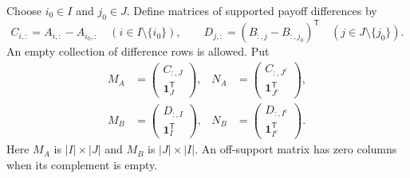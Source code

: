 \documentclass[11pt]{article}
\newcommand{\one}{\mathbf 1}
\theoremstyle{definition}
\theoremstyle{remark}
\begin{document}
Choose $i_0\in I$ and $j_0\in J$. Define matrices of supported payoff
differences by
\[
 C_{i,:}=A_{i,:}-A_{i_0,:}\quad(i\in I\setminus\{i_0\}),\qquad
 D_{j,:}=(B_{:,j}-B_{:,j_0})^{\mathsf T}\quad(j\in J\setminus\{j_0\}).
\]
An empty collection of difference rows is allowed. Put
\begin{equation}\label{eq:rankmatrices}
\begin{aligned}
 M_A&=\begin{pmatrix}C_{:,J}\\\one_J^{\mathsf T}\end{pmatrix},&
 N_A&=\begin{pmatrix}C_{:,J^c}\\\one_{J^c}^{\mathsf T}\end{pmatrix},\\
 M_B&=\begin{pmatrix}D_{:,I}\\\one_I^{\mathsf T}\end{pmatrix},&
 N_B&=\begin{pmatrix}D_{:,I^c}\\\one_{I^c}^{\mathsf T}\end{pmatrix}.
\end{aligned}
\end{equation}
Here $M_A$ is $|I|\times|J|$ and $M_B$ is $|J|\times|I|$.
An off-support matrix has zero columns when its complement is empty.
\end{document}
